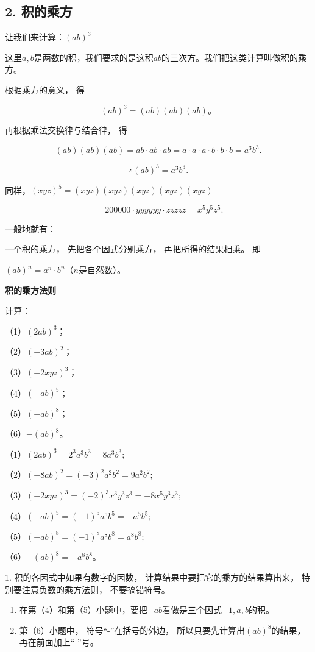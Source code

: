 \subsection{2. 积的乘方}

让我们来计算：\((ab)^{3}\)

这里\(a, b\)是两数的积，我们要求的是这积\(ab\)的三次方。我们把这类计算叫做积的乘方。

根据乘方的意义， 得

\[
(a b) ^{3} = (a b) (a b) (a b)\text{。}
\]

再根据乘法交换律与结合律， 得

\[
(a b) (a b) (a b) = a b \cdot a b \cdot a b = a \cdot a \cdot a \cdot b \cdot b \cdot b = a ^{3} b ^{3}.
\]

\[
\therefore (a b) ^{3} = a ^{3} b ^{3}.
\]

同样，\((xyz)^{5}=(xyz)(xyz)(xyz)(xyz)(xyz)\)

\[
= 200000 \cdot y y y y y y \cdot z z z z z = x ^{5} y ^{5} z ^{5}.
\]

一般地就有：

一个积的乘方， 先把各个因式分别乘方， 再把所得的结果相乘。 即

\((ab)^{n} = a^{n} \cdot b^{n}\)（\(n\)是自然数）。

\textbf{积的乘方法则}

 计算：

（1）\((2ab)^{3}\)；

（2）\((-3ab)^{2}\)；

（3）\((-2xyz)^{3}\)；

（4）\((-ab)^{5}\)；

（5）\((-ab)^{8}\)；

（6）\(-(ab)^{8}\)。

 （1）\((2ab)^{3} = 2^{3}a^{3}b^{3} = 8a^{3}b^{3};\)

（2）\((-8ab)^{2} = (-3)^{2}a^{2}b^{2} = 9a^{2}b^{2};\)

（3）\((-2xyz)^{3} = (-2)^{3}x^{3}y^{3}z^{3} = -8x^{5}y^{3}z^{3};\)

（4）\((-ab)^{5} = (-1)^{5}a^{5}b^{5} = -a^{5}b^{5};\)

（5）\((-ab)^{8} = (-1)^{8}a^{8}b^{8} = a^{8}b^{8};\)

（6）\(-(ab)^{8} = -a^{8}b^{8}\)。

 1. 积的各因式中如果有数字的因数，
计算结果中要把它的乘方的结果算出来， 特别要注意负数的乘方法则，
不要搞错符号。

\begin{enumerate}[start=2]
\item
  在第（4）和第（5）小题中，要把\(-ab\)看做是三个因式\(-1, a, b\)的积。
\item
  第（6）小题中， 符号``-''在括号的外边，
  所以只要先计算出\((ab)^{8}\)的结果， 再在前面加上``-''号。
\end{enumerate}

